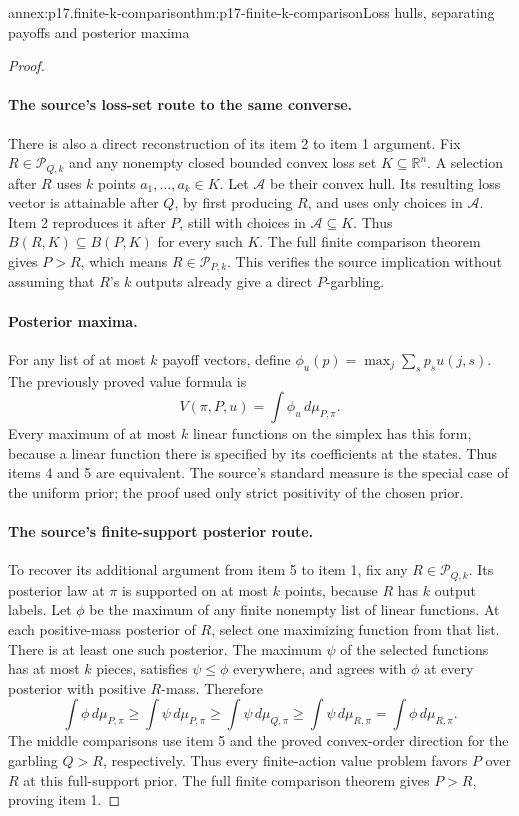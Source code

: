 \begin{annexitem}{annex:p17.finite-k-comparison}{thm:p17-finite-k-comparison}{Loss hulls, separating payoffs and posterior maxima}
\begin{proof}
\paragraph{The source's loss-set route to the same converse.}
There is also a direct reconstruction of its item 2 to item 1 argument.
Fix \(R\in\mathcal P_{Q,k}\) and any nonempty closed bounded convex
loss set \(K\subseteq\mathbb R^n\).
A selection after \(R\) uses \(k\) points \(a_1,\ldots,a_k\in K\).
Let \(\mathcal A\) be their convex hull. Its resulting loss vector is
attainable after \(Q\), by first producing \(R\), and uses only choices
in \(\mathcal A\). Item 2 reproduces it after \(P\), still with choices
in \(\mathcal A\subseteq K\).
Thus \(B(R,K)\subseteq B(P,K)\) for every such \(K\).
The full finite comparison theorem gives \(P>R\), which means
\(R\in\mathcal P_{P,k}\). This verifies the source implication without
assuming that \(R\)'s \(k\) outputs already give a direct \(P\)-garbling.

\paragraph{Posterior maxima.}
For any list of at most \(k\) payoff vectors, define
\(\phi_u(p)=\max_j\sum_s p_su(j,s)\).
The previously proved value formula is
\[
                  V(\pi,P,u)=\int\phi_u\,d\mu_{P,\pi}.
\]
Every maximum of at most \(k\) linear functions on the simplex has
this form, because a linear function there is specified by its coefficients
at the states. Thus items 4 and 5 are equivalent.
The source's standard measure is the special case of the uniform prior;
the proof used only strict positivity of the chosen prior.

\paragraph{The source's finite-support posterior route.}
To recover its additional argument from item 5 to item 1, fix any
\(R\in\mathcal P_{Q,k}\). Its posterior law at \(\pi\) is supported
on at most \(k\) points, because \(R\) has \(k\) output labels.
Let \(\phi\) be the maximum of any finite nonempty list of linear
functions. At each positive-mass posterior of \(R\), select one
maximizing function from that list. There is at least one such posterior.
The maximum \(\psi\) of the selected functions has at most \(k\)
pieces, satisfies \(\psi\leq\phi\) everywhere, and agrees with \(\phi\)
at every posterior with positive \(R\)-mass. Therefore
\[
 \int\phi\,d\mu_{P,\pi}
 \geq\int\psi\,d\mu_{P,\pi}
 \geq\int\psi\,d\mu_{Q,\pi}
 \geq\int\psi\,d\mu_{R,\pi}
 =\int\phi\,d\mu_{R,\pi}.
\]
The middle comparisons use item 5 and the proved convex-order direction
for the garbling \(Q>R\), respectively. Thus every finite-action value
problem favors \(P\) over \(R\) at this full-support prior.
The full finite comparison theorem gives \(P>R\), proving item 1.


\end{proof}
\end{annexitem}
